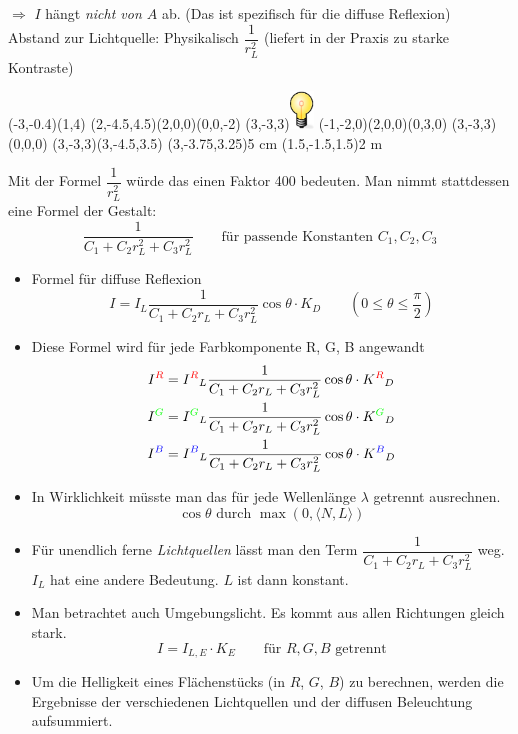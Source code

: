 	$\Rightarrow$ $I$ hängt \emph{nicht von $A$} ab. (Das ist spezifisch für die diffuse Reflexion)\\
	Abstand zur Lichtquelle: Physikalisch $\dfrac{1}{r_L^2}$ (liefert in der Praxis zu starke
	Kontraste)
	\begin{center}
		\begin{pspicture}(-3,-0.4)(1,4)
			\pstThreeDSquare(2,-4.5,4.5)(2,0,0)(0,0,-2)
			\pstThreeDPut(3,-3,3){\includegraphics[height=1cm]{bulb.eps}}
			\pstThreeDSquare(-1,-2,0)(2,0,0)(0,3,0)
			\pstThreeDLine[linecolor=yellow]{->}(3,-3,3)(0,0,0)
			\pstThreeDLine[linecolor=yellow]{->}(3,-3,3)(3,-4.5,3.5)
			\pstThreeDPut(3,-3.75,3.25){5 cm}
			\pstThreeDPut(1.5,-1.5,1.5){2 m}
		\end{pspicture}
	\end{center}
	Mit der Formel $\dfrac{1}{r_L^2}$ würde das einen Faktor 400 bedeuten.
	Man nimmt stattdessen eine Formel der Gestalt:
	\[\frac{1}{C_1 + C_2 r_L^2 + C_3 r_L^2} \qquad \text{für passende Konstanten $C_1, C_2, C_3$}\]
	\begin{itemize}
	 \item Formel für diffuse Reflexion
		\[\boxed{I = I_L \frac{1}{C_1 + C_2 r_L + C_3 r_L^2} \cos \theta \cdot K_D} \qquad \left(0 \le \theta \le \frac{\pi}{2}\right)\]
	 \item Diese Formel wird für jede Farbkomponente {\color{red}R}, {\color{green}G}, {\color{blue}B} angewandt
		\begin{align*}
		I^{\color{red}R} &= I^{\color{red}R}_L \frac{1}{C_1 + C_2 r_L + C_3 r_L^2} \cos \theta \cdot K^{\color{red}R}_D\\
		I^{\color{green}G} &= I^{\color{green}G}_L \frac{1}{C_1 + C_2 r_L + C_3 r_L^2} \cos \theta \cdot K^{\color{green}G}_D\\
		I^{\color{blue}B} &= I^{\color{blue}B}_L \frac{1}{C_1 + C_2 r_L + C_3 r_L^2} \cos \theta \cdot K^{\color{blue}B}_D
		\end{align*}
	 \item In Wirklichkeit müsste man das für jede Wellenlänge $\lambda$ getrennt ausrechnen.
		\[\cos \theta \text{ durch } \max(0,\langle N, L \rangle)\]
	 \item Für unendlich ferne \emph{Lichtquellen} lässt man den Term $\dfrac{1}{C_1 + C_2 r_L + C_3 r_L^2}$ weg.
		$I_L$ hat eine andere Bedeutung. $L$ ist dann konstant.

	 \item Man betrachtet auch Umgebungslicht. Es kommt aus allen Richtungen gleich stark.
		\[ I = I_{L,E} \cdot K_E \qquad \text{für $R,G,B$ getrennt}\]
	 \item Um die Helligkeit eines Flächenstücks (in $R$, $G$, $B$) zu berechnen, werden die Ergebnisse der verschiedenen
		Lichtquellen und der diffusen Beleuchtung aufsummiert.
	\end{itemize}




